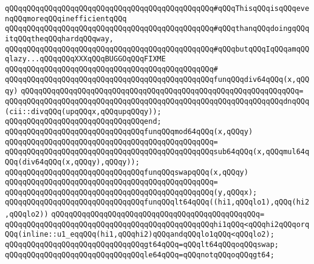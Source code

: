 \newline
\verb|qQQqqQQqqQQqqQQqqQQqqQQqqQQqqQQqqQQqqQQqqQQqqQQq#qQQqThisqQQqisqQQqevenqQQqmoreqQQqinefficientqQQq|\newline
\verb|qQQqqQQqqQQqqQQqqQQqqQQqqQQqqQQqqQQqqQQqqQQqqQQq#qQQqthanqQQqdoingqQQqitqQQqtheqQQqhardqQQqway,|\newline
\verb|qQQqqQQqqQQqqQQqqQQqqQQqqQQqqQQqqQQqqQQqqQQqqQQq#qQQqbutqQQqIqQQqamqQQqlazy...qQQqqQQqXXXqQQqBUGGOqQQqFIXME|\newline
\verb|qQQqqQQqqQQqqQQqqQQqqQQqqQQqqQQqqQQqqQQqqQQqqQQq#|\newline
\verb|qQQqqQQqqQQqqQQqqQQqqQQqqQQqqQQqqQQqqQQqqQQqqQQqfunqQQqdiv64qQQq(x,qQQqy)|\newline
\verb|qQQqqQQqqQQqqQQqqQQqqQQqqQQqqQQqqQQqqQQqqQQqqQQqqQQqqQQqqQQqqQQq=|\newline
\verb|qQQqqQQqqQQqqQQqqQQqqQQqqQQqqQQqqQQqqQQqqQQqqQQqqQQqqQQqqQQqqQQqdnqQQq(cii::divqQQq(upqQQqx,qQQqupqQQqy));|\newline
\verb|qQQqqQQqqQQqqQQqqQQqqQQqqQQqqQQqend;|\newline
\newline
\verb|qQQqqQQqqQQqqQQqqQQqqQQqqQQqqQQqfunqQQqmod64qQQq(x,qQQqy)|\newline
\verb|qQQqqQQqqQQqqQQqqQQqqQQqqQQqqQQqqQQqqQQqqQQqqQQq=|\newline
\verb|qQQqqQQqqQQqqQQqqQQqqQQqqQQqqQQqqQQqqQQqqQQqqQQqsub64qQQq(x,qQQqmul64qQQq(div64qQQq(x,qQQqy),qQQqy));|\newline
\newline
\verb|qQQqqQQqqQQqqQQqqQQqqQQqqQQqqQQqfunqQQqswapqQQq(x,qQQqy)|\newline
\verb|qQQqqQQqqQQqqQQqqQQqqQQqqQQqqQQqqQQqqQQqqQQqqQQq=|\newline
\verb|qQQqqQQqqQQqqQQqqQQqqQQqqQQqqQQqqQQqqQQqqQQqqQQq(y,qQQqx);|\newline
\newline
\verb|qQQqqQQqqQQqqQQqqQQqqQQqqQQqqQQqfunqQQqlt64qQQq((hi1,qQQqlo1),qQQq(hi2,qQQqlo2))|\newline
\verb|qQQqqQQqqQQqqQQqqQQqqQQqqQQqqQQqqQQqqQQqqQQqqQQq=|\newline
\verb|qQQqqQQqqQQqqQQqqQQqqQQqqQQqqQQqqQQqqQQqqQQqqQQqhi1qQQq<qQQqhi2qQQqorqQQq(inline::u1_eqqQQq(hi1,qQQqhi2)qQQqandqQQqlo1qQQq<qQQqlo2);|\newline
\newline
\verb|qQQqqQQqqQQqqQQqqQQqqQQqqQQqqQQqgt64qQQq=qQQqlt64qQQqoqQQqswap;|\newline
\verb|qQQqqQQqqQQqqQQqqQQqqQQqqQQqqQQqle64qQQq=qQQqnotqQQqoqQQqgt64;|\newline
